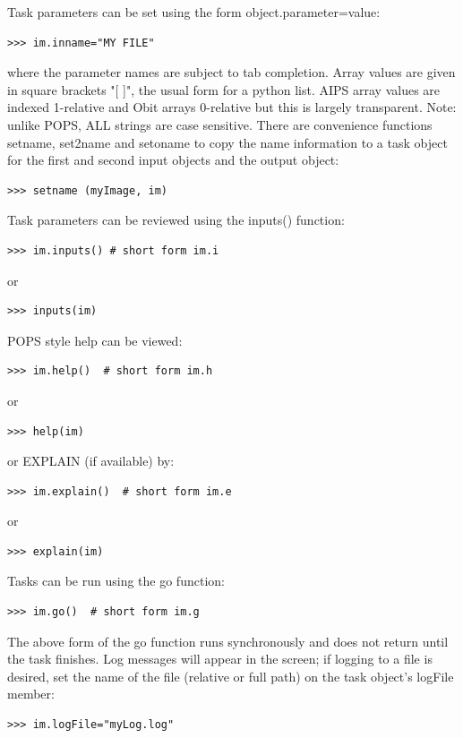 \documentclass[11pt]{report}
\begin{document}
Task parameters can be set using the form object.parameter=value:
\begin{verbatim}
>>> im.inname="MY FILE"
\end{verbatim}
where the parameter names are subject to tab completion.
Array values are given in square brackets "[  ]", the usual form
for a python list.  AIPS array values are indexed 1-relative and Obit
arrays 0-relative but this is largely transparent.
Note: unlike POPS, ALL strings are case sensitive.
There are convenience functions setname, set2name and setoname to copy
the name information to a task object for the first and second input
objects and the output object:
\begin{verbatim}
>>> setname (myImage, im)
\end{verbatim}


Task parameters can be reviewed using the inputs() function:
\begin{verbatim}
>>> im.inputs() # short form im.i
\end{verbatim}
or
\begin{verbatim}
>>> inputs(im)
\end{verbatim}

POPS style help can be viewed:
\begin{verbatim}
>>> im.help()  # short form im.h
\end{verbatim}
or
\begin{verbatim}
>>> help(im)
\end{verbatim}
or EXPLAIN (if available) by:
\begin{verbatim}
>>> im.explain()  # short form im.e
\end{verbatim}
or
\begin{verbatim}
>>> explain(im)
\end{verbatim}

Tasks can be run using the go function:
\begin{verbatim}
>>> im.go()  # short form im.g
\end{verbatim}
The above form of the go function runs synchronously and does not return
until the task finishes. 
Log messages will appear in the screen; if logging to a file is
desired, set the name of the file (relative or full path) on the task
object's logFile member:
\begin{verbatim}
>>> im.logFile="myLog.log"
\end{verbatim}
\end{document}
